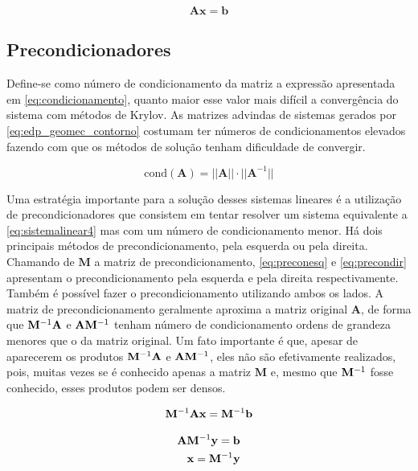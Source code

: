 \begin{equation} \label{eq:sistemalinear4}
    \mathbf{Ax = b}
\end{equation}

\subsection{Precondicionadores}

Define-se como número de condicionamento da matriz a expressão apresentada em \eqref{eq:condicionamento}, quanto maior esse valor mais difícil a convergência do sistema com métodos de Krylov. As matrizes advindas de sistemas gerados por \eqref{eq:edp_geomec_contorno} costumam ter números de condicionamentos elevados fazendo com que os métodos de solução tenham dificuldade de convergir.

\begin{equation} \label{eq:condicionamento}
\text{cond}(\mathbf{A}) = || \mathbf{A} || \cdot || \mathbf{A}^{-1} ||
\end{equation}


Uma estratégia importante para a solução desses sistemas lineares é a utilização de precondicionadores que consistem em tentar resolver um sistema equivalente a \eqref{eq:sistemalinear4} mas com um número de condicionamento menor. Há dois principais métodos de precondicionamento, pela esquerda ou pela direita. Chamando de $\mathbf{M}$ a matriz de precondicionamento, \eqref{eq:preconesq} e \eqref{eq:precondir} apresentam o precondicionamento pela esquerda e pela direita respectivamente. Também é possível fazer o precondicionamento utilizando ambos os lados. A matriz de precondicionamento geralmente aproxima a matriz original $\mathbf{A}$, de forma que $\mathbf{M}^{-1} \mathbf{A}$ e $\mathbf{A} \mathbf{M}^{-1}$ tenham número de condicionamento ordens de grandeza menores que o da matriz original. Um fato importante é que, apesar de aparecerem os produtos $\mathbf{M}^{-1} \mathbf{A}$ e $\mathbf{A} \mathbf{M}^{-1}$, eles não são efetivamente realizados, pois, muitas vezes se é conhecido apenas a matriz $\mathbf{M}$ e, mesmo que $\mathbf{M}^{-1}$ fosse conhecido, esses produtos podem ser densos.  


\begin{equation} \label{eq:preconesq}
\mathbf{M}^{-1} \mathbf{A} \mathbf{x}= \mathbf{M}^{-1} \mathbf{b}
\end{equation}

\begin{align} \label{eq:precondir}
\mathbf{A} \mathbf{M}^{-1} \mathbf{y} = \mathbf{b} \\
\mathbf{x} = \mathbf{M}^{-1} \mathbf{{y}}
\end{align}



